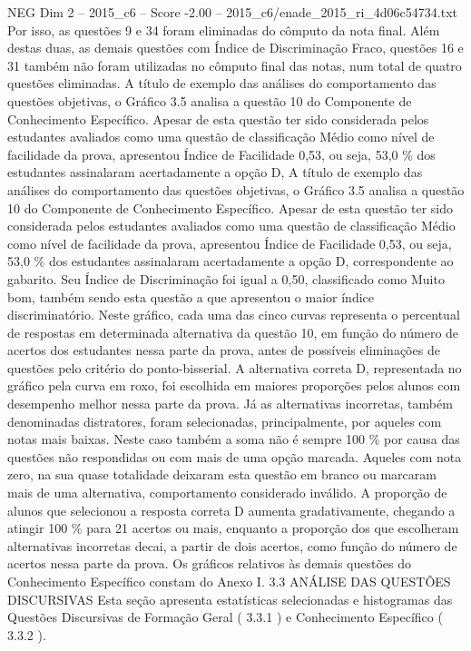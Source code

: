 \begin{textsample}{NEG Dim 2 – 2015\_c6 – Score -2.00 – 2015\_c6/enade\_2015\_ri\_4d06c54734.txt}
Por isso, as questões 9 e 34 foram eliminadas do cômputo da nota final.
Além destas duas, as demais questões com Índice de Discriminação Fraco, questões 16 e 31 também não foram utilizadas no cômputo final das notas, num total de quatro questões eliminadas.
A título de exemplo das análises do comportamento das questões objetivas, o Gráfico 3.5 analisa a questão 10 do Componente de Conhecimento Específico.
Apesar de esta questão ter sido considerada pelos estudantes avaliados como uma questão de classificação Médio como nível de facilidade da prova, apresentou Índice de Facilidade 0,53, ou seja, 53,0 \% dos estudantes assinalaram acertadamente a opção D, A título de exemplo das análises do comportamento das questões objetivas, o Gráfico 3.5 analisa a questão 10 do Componente de Conhecimento Específico.
Apesar de esta questão ter sido considerada pelos estudantes avaliados como uma questão de classificação Médio como nível de facilidade da prova, apresentou Índice de Facilidade 0,53, ou seja, 53,0 \% dos estudantes assinalaram acertadamente a opção D, correspondente ao gabarito.
Seu Índice de Discriminação foi igual a 0,50, classificado como Muito bom, também sendo esta questão a que apresentou o maior índice discriminatório.
Neste gráfico, cada uma das cinco curvas representa o percentual de respostas em determinada alternativa da questão 10, em função do número de acertos dos estudantes nessa parte da prova, antes de possíveis eliminações de questões pelo critério do ponto-bisserial.
A alternativa correta D, representada no gráfico pela curva em roxo, foi escolhida em maiores proporções pelos alunos com desempenho melhor nessa parte da prova.
Já as alternativas incorretas, também denominadas distratores, foram selecionadas, principalmente, por aqueles com notas mais baixas.
Neste caso também a soma não é sempre 100 \% por causa das questões não respondidas ou com mais de uma opção marcada.
Aqueles com nota zero, na sua quase totalidade deixaram esta questão em branco ou marcaram mais de uma alternativa, comportamento considerado inválido.
A proporção de alunos que selecionou a resposta correta D aumenta gradativamente, chegando a atingir 100 \% para 21 acertos ou mais, enquanto a proporção dos que escolheram alternativas incorretas decai, a partir de dois acertos, como função do número de acertos nessa parte da prova.
Os gráficos relativos às demais questões do Conhecimento Específico constam do Anexo I. 3.3 ANÁLISE DAS QUESTÕES DISCURSIVAS Esta seção apresenta estatísticas selecionadas e histogramas das Questões Discursivas de Formação Geral ( 3.3.1 ) e Conhecimento Específico ( 3.3.2 ).

\end{textsample}

